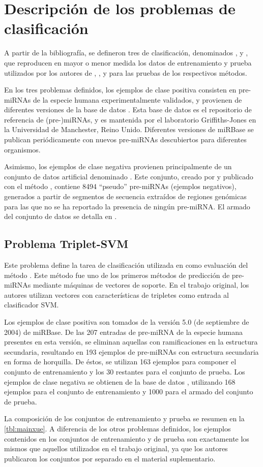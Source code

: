 \section{Descripción de los problemas de clasificación}
A partir de la bibliografía, se defineron tres  de
clasificación, denominados ,  y
, que reproducen en mayor o menor medida los datos de
entrenamiento y prueba utilizados por los autores de
 \cite{xue},  \cite{ng}, y
 \cite{batuwita} para las pruebas de los respectivos
métodos.

En los tres problemas definidos, los ejemplos de clase positiva
consisten en pre-miRNAs de la especie humana experimentalmente
validados, y provienen de diferentes versiones de la base de datos
 \cite{mirbase1, mirbase2, mirbase3}.  Esta base de datos es el
repositorio de referencia de \mbox{(pre-)}miRNAs, y es mantenida por el
laboratorio Griffiths-Jones en la Universidad de Manchester, Reino
Unido. Diferentes versiones de miRBase se publican periódicamente con
nuevos pre-miRNAs descubiertos para diferentes organismos.

Asimismo, los ejemplos de clase negativa provienen principalmente de
un conjunto de datos artificial denominado . Este conjunto,
creado por \citeauthor{xue} y publicado con el método ,
contiene 8494 ``pseudo'' pre-miRNAs (ejemplos negativos), generados a
partir de segmentos de secuencia extraídos de regiones genómicas para
las que no se ha reportado la presencia de ningún pre-miRNA.  El
armado del conjunto de datos  se detalla en \cite{xue}.

\subsection{Problema Triplet-SVM}
Este problema define la tarea de clasificación utilizada en \cite{xue}
como evaluación del método .  Este método fue uno de
los primeros métodos de predicción de pre-miRNAs mediante máquinas de
vectores de soporte.  En el trabajo original, los autores utilizan
vectores con características de tripletes como entrada al clasificador
SVM.

Los ejemplos de clase positiva son tomados de la versión 5.0 (de
septiembre de 2004) de miRBase. De las 207 entradas de pre-miRNA de la
especie humana presentes en esta versión, se eliminan aquellas con
ramificaciones en la estructura secundaria, resultando en 193 ejemplos
de pre-miRNAs con estructura secundaria en forma de horquilla.  De
éstos, se utilizan 163 ejemplos para componer el conjunto de
entrenamiento y los 30 restantes para el conjunto de prueba.  Los
ejemplos de clase negativa se obtienen de la base de datos ,
utilizando 168 ejemplos para el conjunto de entrenamiento y 1000 para
el armado del conjunto de prueba.

La composición de los conjuntos de entrenamiento y prueba se resumen
en la \autoref{tbl:mainxue}. A diferencia de los otros problemas
definidos, los ejemplos contenidos en los conjuntos de entrenamiento y
de prueba son exactamente los mismos que aquellos utilizados en el
trabajo original, ya que los autores publicaron los conjuntos por
separado en el material suplementario.
